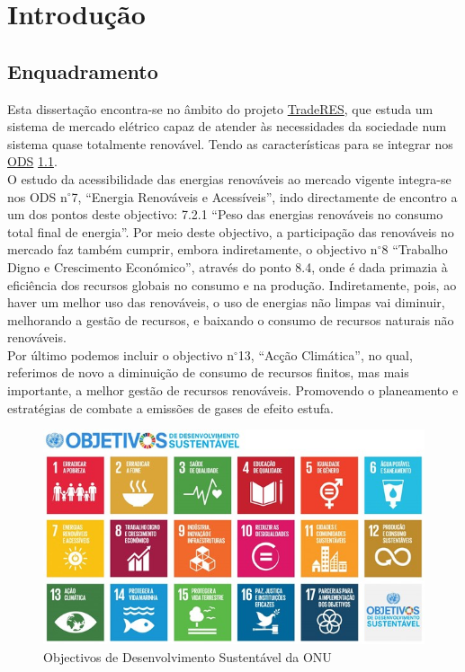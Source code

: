 \chapter{Introdução}

\section{Enquadramento\label{se:enquadramento}}
Esta dissertação encontra-se no âmbito do projeto \href{https://traderes.eu/}{TradeRES}, que estuda um sistema de mercado elétrico capaz de atender às necessidades da sociedade num sistema quase totalmente renovável. Tendo as características para se integrar nos \href{https://ods.pt/ods/}{ODS} \ref{fig:ODS}. \\
O estudo da acessibilidade das energias renováveis ao mercado vigente integra-se nos ODS n$^{\circ}$7, “Energia Renováveis e Acessíveis”, indo directamente de encontro a um dos pontos deste objectivo: 7.2.1 “Peso das energias renováveis no consumo total final de energia”. Por meio deste objectivo, a participação das renováveis no mercado faz também cumprir, embora indiretamente, o objectivo n$^{\circ}$8 “Trabalho Digno e Crescimento Económico”, através do ponto 8.4, onde é dada primazia à eficiência dos recursos globais no consumo e na produção. Indiretamente, pois, ao haver um melhor uso das renováveis, o uso de energias não limpas vai diminuir, melhorando a gestão de recursos, e baixando o consumo de recursos naturais não renováveis. \\
Por último podemos incluir o objectivo n$^{\circ}$13, “Acção Climática”, no qual, referimos de novo a diminuição de consumo de recursos finitos, mas mais importante, a melhor gestão de recursos renováveis. Promovendo o planeamento e estratégias de combate a emissões de gases de efeito estufa. \\

\begin{figure}[h]
    \centering
    \includegraphics{Imagens/DesenvolvimentoSustentavel.jpg}
    \caption{Objectivos de Desenvolvimento Sustentável da ONU}
    \label{fig:ODS}
\end{figure}

